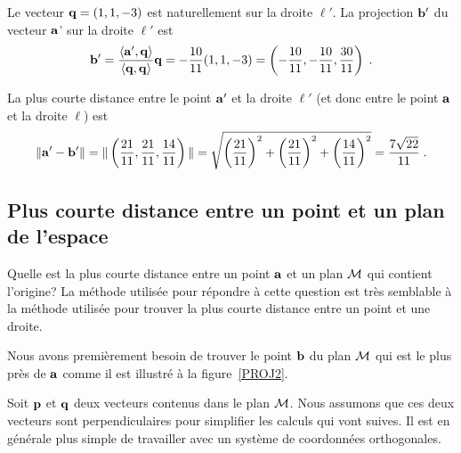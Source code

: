{\begin{egg}
Le vecteur $\mathbf{q} = (1,1,-3)$ est naturellement sur la droite
$\ell'$.  La projection $\mathbf{b}'$ du vecteur $\mathbf{a}$' sur la droite
$\ell'$ est
\[
\mathbf{b}' = \frac{\left\langle{\mathbf{a}'} , {\mathbf{q}}\right\rangle}{\left\langle{\mathbf{q}} , {\mathbf{q}}\right\rangle} \mathbf{q}
= -\frac{10}{11} (1,1,-3)
= \left(-\frac{10}{11}, -\frac{10}{11}, \frac{30}{11} \right) \; .
\]

La plus courte distance entre le point $\mathbf{a}'$ et la droite $\ell'$
(et donc entre le point $\mathbf{a}$ et la droite $\ell$) est
\[
\|\mathbf{a}'-\mathbf{b}'\| =
\| \left(\frac{21}{11}, \frac{21}{11}, \frac{14}{11} \right) \|
= \sqrt{ \left(\frac{21}{11}\right)^2 + \left(\frac{21}{11}\right)^2
+ \left(\frac{14}{11}\right)^2 } 
= \frac{7\sqrt{22}}{11} \; .
\]
\end{egg}

\subsection{Plus courte distance entre un point et un plan de
l'espace}

Quelle est la plus courte distance entre un point $\mathbf{a}$ et un plan
$\cal M$ qui contient l'origine?  La méthode utilisée pour répondre à
cette question est très semblable à la méthode utilisée pour trouver
la plus courte distance entre un point et une droite.

Nous avons premièrement besoin de trouver le point $\mathbf{b}$ du plan
$\cal M$ qui est le plus près de $\mathbf{a}$ comme il est illustré à la
figure~\ref{PROJ2}.


Soit $\mathbf{p}$ et $\mathbf{q}$ deux vecteurs contenus dans le
plan $\cal M$.  Nous assumons que ces deux vecteurs sont perpendiculaires
pour simplifier les calculs qui vont suives.  Il est en générale plus
simple de travailler avec un système de coordonnées orthogonales.

}
